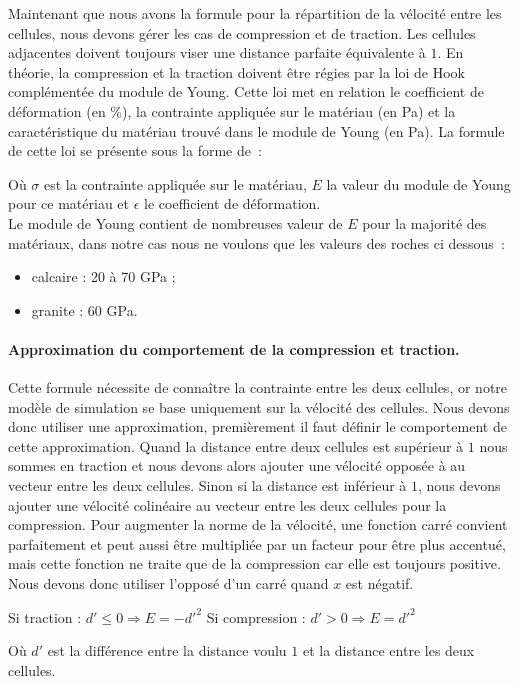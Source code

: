 \documentclass[a4paper,11pt]{article}
\begin{document}
Maintenant que nous avons la formule pour la répartition de la vélocité entre les cellules, nous devons gérer les cas de compression et de traction.
Les cellules adjacentes doivent toujours viser une distance parfaite équivalente à $1$.
En théorie, la compression et la traction doivent être régies par la loi de Hook complémentée du module de Young. Cette loi met en relation le coefficient de déformation (en \%), la contrainte appliquée sur le matériau (en Pa) et la caractéristique du matériau trouvé dans le module de Young (en Pa).
La formule de cette loi se présente sous la forme de~:
\begin{center}
\end{center}
Où $\sigma$ est la contrainte appliquée sur le matériau, $E$ la valeur du module de Young pour ce matériau et $\epsilon$ le coefficient de déformation. \\
Le module de Young contient de nombreuses valeur de $E$ pour la majorité des matériaux, dans notre cas nous ne voulons que les valeurs des roches ci dessous~:
\begin{itemize}
  \item calcaire : 20 à 70 GPa ;
  \item granite : 60 GPa.
\end{itemize}


\paragraph{Approximation du comportement de la compression et traction.}

Cette formule nécessite de connaître la contrainte entre les deux cellules, or notre modèle de simulation se base uniquement sur la vélocité des cellules.
Nous devons donc utiliser une approximation, premièrement il faut définir le comportement de cette approximation.
Quand la distance entre deux cellules est supérieur à $1$ nous sommes en traction et nous devons alors ajouter une vélocité opposée à au vecteur entre les deux cellules.
Sinon si la distance est inférieur à $1$, nous devons ajouter une vélocité colinéaire au vecteur entre les deux cellules pour la compression.
Pour augmenter la norme de la vélocité, une fonction carré convient parfaitement et peut aussi être multipliée par un facteur pour être plus accentué, mais cette fonction ne traite que de la compression car elle est toujours positive.
Nous devons donc utiliser l'opposé d'un carré quand $x$ est négatif.
\medbreak
\begin{center}
  Si traction : $d' \leqslant 0 \Rightarrow E = -d'^2$ \medbreak
  Si compression : $d' > 0 \Rightarrow E = d'^2$
\end{center}
Où $d'$ est la différence entre la distance voulu $1$ et la distance entre les deux cellules. \\
\end{document}
